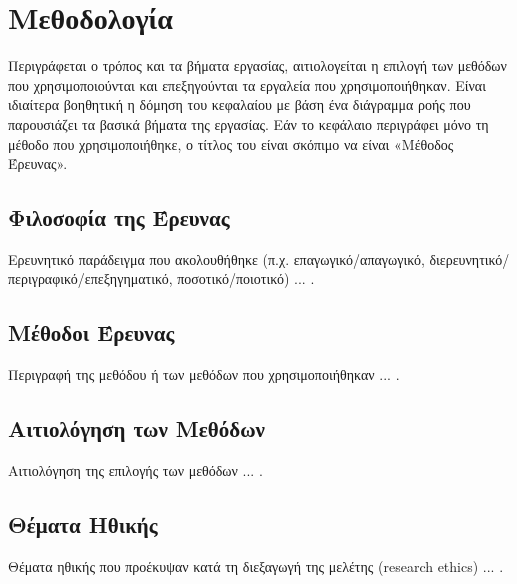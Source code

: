\section{Μεθοδολογία}

Περιγράφεται ο τρόπος και τα βήματα εργασίας, αιτιολογείται η επιλογή των
μεθόδων που χρησιμοποιούνται και επεξηγούνται τα εργαλεία που
χρησιμοποιήθηκαν. Είναι ιδιαίτερα βοηθητική η δόμηση του κεφαλαίου με βάση
ένα διάγραμμα ροής που παρουσιάζει τα βασικά βήματα της εργασίας. Εάν το
κεφάλαιο περιγράφει μόνο τη μέθοδο που χρησιμοποιήθηκε, ο τίτλος του είναι
σκόπιμο να είναι «Μέθοδος Έρευνας».

\subsection{Φιλοσοφία της Έρευνας}

Ερευνητικό παράδειγμα που ακολουθήθηκε (π.χ. επαγωγικό\slash απαγωγικό,
διερευνητικό\slash περιγραφικό\slash επεξηγηματικό, ποσοτικό\slash ποιοτικό) ... .

\subsection{Μέθοδοι Έρευνας}

Περιγραφή της μεθόδου ή των μεθόδων που χρησιμοποιήθηκαν ... .

\subsection{Αιτιολόγηση των Μεθόδων}

Αιτιολόγηση της επιλογής των μεθόδων ... .

\subsection{Θέματα Ηθικής}

Θέματα ηθικής που προέκυψαν κατά τη διεξαγωγή της μελέτης (research
ethics) ... .

